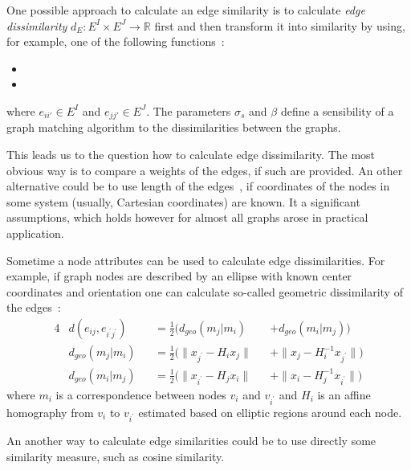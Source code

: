 One possible approach to calculate an edge similarity is to calculate \emph{edge dissimilarity} $d_E:E^I\times E^J\rightarrow\mathbb{R}$ first and then transform it into similarity by using, for example, one of the following functions~\cite{Cho2014_Haystack, Cho2009_AgglClustering, Cho2010_RRWM,Cho2012_ProgressiveGM}:
\begin{itemize}
	\item {}
	\item {}
\end{itemize}
where $e_{ii\prime}\in E^I$ and $e_{jj\prime}\in E^J$. The parameters $\sigma_s$ and $\beta$ define a sensibility of a graph matching algorithm to the dissimilarities between the graphs.

This leads us to the question how to calculate edge dissimilarity. The most obvious way is to compare a weights of the edges, if such are provided. An other alternative could be to use length of the edges~\cite{Cho2014_Haystack, Cho2009_AgglClustering, Cho2010_RRWM,Cho2012_ProgressiveGM}, if coordinates of the nodes in some system (usually, Cartesian coordinates) are known. It a significant assumptions, which holds however for almost all graphs arose in practical application.

Sometime a node attributes can be used to calculate edge dissimilarities. For example, if graph nodes are described by an ellipse with known center coordinates and orientation one can calculate so-called geometric dissimilarity of the edges~\cite{Cho2009_AgglClustering,Cho2012_ProgressiveGM}:
\begin{alignat}{4}\label{eq:geomDiss}
& d(e_{ij},e_{i^\prime j^\prime}) && =\frac{1}{2}(d_{geo}(m_j|m_i) && +d_{geo}(m_i|m_j)) \\
& d_{geo}(m_j|m_i) && =\frac{1}{2}(\|x_{j^\prime}-H_{i}x_j\| && + \|x_{j}-H^{-1}_ix_{j^\prime}\|) \\
& d_{geo}(m_i|m_j) && =\frac{1}{2}(\|x_{i^\prime}-H_{j}x_i\| && + \|x_{i}-H^{-1}_{j}x_{i^\prime}\|) 
\end{alignat}
where $m_i$ is a correspondence between nodes $v_i$ and $v_{i^\prime}$ and $H_i$ is an affine homography from $v_i$ to $v_{i^\prime}$ estimated based on elliptic regions around each node.

An another way to calculate edge similarities could be to use directly some similarity measure, such as cosine similarity.

